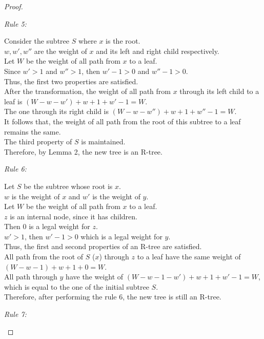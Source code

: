 \documentclass[10pt]{article}
\begin{document}
\begin{enumerate}
\begin{proof}
\begin{addmargin}[1em]{0em}
		\textit{Rule 5:}
		\begin{addmargin}[1em]{0em}
			Consider the subtree $S$ where $x$ is the root. \\
			$w, w', w''$ are the weight of $x$ and its left and right child
			respectively. \\
			Let $W$ be the weight of all path from $x$ to a leaf. \\
			Since $w' > 1$ and $w'' > 1$, then $w'-1 > 0$ and $w''-1 > 0$. \\
			Thus, the first two properties are satisfied. \\
			After the transformation, the weight of all path from $x$ through
			its left child to a leaf is $(W - w - w') + w+1 + w'-1 = W$. \\
			The one through its right child is $(W - w - w'') + w+1 + w''-1 =
			W$. \\
			It follows that, the weight of all path from the root of this
			subtree to a leaf remains the same. \\
			The third property of $S$ is maintained. \\
			Therefore, by Lemma 2, the new tree is an R-tree.
		\end{addmargin}

		\textit{Rule 6:}
		\begin{addmargin}[1em]{0em}
			Let $S$ be the subtree whose root is $x$. \\
			$w$ is the weight of $x$ and $w'$ is the weight of $y$. \\
			Let $W$ be the weight of all path from $x$ to a leaf. \\
			$z$ is an internal node, since it has children. \\
			Then 0 is a legal weight for $z$. \\
			$w' > 1$, then $w'-1 > 0$ which is a legal weight for $y$. \\
			Thus, the first and second properties of an R-tree are satisfied. \\
			All path from the root of $S$ ($x$) through $z$ to a leaf have the
			same weight of $(W-w-1) + w+1 + 0 = W$. \\
			All path through $y$ have the weight of $(W-w-1-w') + w+1 + w'-1 =
			W$, which is equal to the one of the initial subtree $S$. \\
			Therefore, after performing the rule 6, the new tree is still an
			R-tree.
		\end{addmargin}

		\textit{Rule 7:}


\end{addmargin}
\end{proof}
\end{enumerate}
\end{document}
